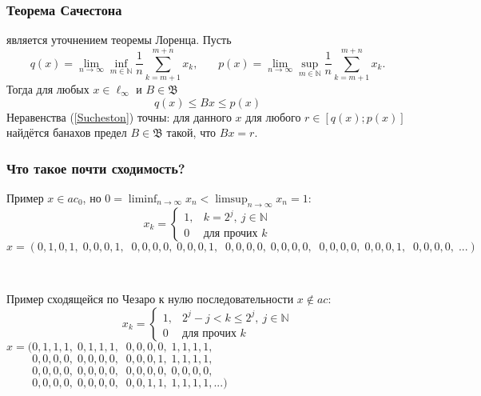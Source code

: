 \begin{frame}\frametitle{Теорема Сачестона~\cite{S}}
	является уточнением теоремы Лоренца.
	Пусть
	\begin{equation*}
		q(x) = \lim_{n\to\infty} \inf_{m\in\mathbb{N}}  \frac{1}{n} \sum_{k=m+1}^{m+n} x_k,
		~~~~~~~~
		p(x) = \lim_{n\to\infty} \sup_{m\in\mathbb{N}}  \frac{1}{n} \sum_{k=m+1}^{m+n} x_k.
	\end{equation*}
	Тогда для любых $x\in \ell_\infty$ и $B\in\mathfrak{B}$
	\begin{equation}\label{Sucheston}
		q(x) \leqslant Bx \leqslant p(x)
	\end{equation}
	Неравенства (\ref{Sucheston}) точны:
	для данного $x$ для любого $r\in[q(x); p(x)]$ найдётся банахов предел
	$B\in\mathfrak{B}$ такой, что $Bx = r$.
\end{frame}

\begin{frame}\frametitle{Что такое почти сходимость?}
	\begin{varwidth}[t]{\linewidth}
		\hspace{3em}
		Пример $x\in ac_0$, но $\displaystyle0=\liminf_{n\to\infty}x_n < \limsup_{n\to\infty}x_n=1$:~~
		$$\displaystyle
			x_k=\begin{cases}
				1, & k=2^j,~j\in\mathbb N
				\\
				0 & \mbox{для прочих~} k
			\end{cases}
		$$
		$x=(0,1,0,1,\;0,0,0,1,\;\;0,0,0,0,\;0,0,0,1,\;\;0,0,0,0,\;0,0,0,0,\;\;0,0,0,0,\;0,0,0,1,\;\;0,0,0,0,\;...)$
	\end{varwidth}
	\\
	\vspace{2em}
	\begin{varwidth}[t]{\linewidth}
		Пример сходящейся по Чезаро к нулю последовательности $x\notin ac$:~~
		$$\displaystyle
			x_k=\begin{cases}
				1, & 2^j-j < k \leq 2^j,~j\in\mathbb N
				\\
				0 & \mbox{для прочих~} k
			\end{cases}
		$$
		$x=(0,1,1,1,\;0,1,1,1,\;\;0,0,0,0,\;1,1,1,1,$\\
		$\phantom{x=(}0,0,0,0,\;0,0,0,0,\;\;0,0,0,1,\;1,1,1,1,$\\
		$\phantom{x=(}0,0,0,0,\;0,0,0,0,\;\;0,0,0,0,\;0,0,0,0,$\\
		$\phantom{x=(}0,0,0,0,\;0,0,0,0,\;\;0,0,1,1,\;1,1,1,1,...)$
	\end{varwidth}
\end{frame}


